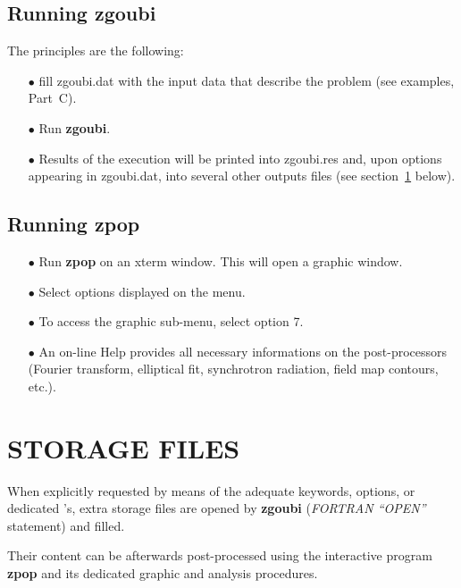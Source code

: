  \subsection{Running zgoubi} 

The principles are the following:
\begin{itemize}
\item[$\bullet$] fill zgoubi.dat    with the input data that describe the 
problem (see examples, Part~C). 
\item[$\bullet$] Run  \textbf{zgoubi}. 
\item[$\bullet$] Results of the execution will be printed into  
zgoubi.res  and, upon options appearing in zgoubi.dat,
 into several other outputs files (see section~\ref{secD-3} below).  
\end{itemize}

\subsection{Running zpop} 

\begin{itemize}
\item[$\bullet$] Run \textbf{zpop} on an xterm window. This will open a 
graphic window. 
\item[$\bullet$] Select options displayed on the menu.   
\item[$\bullet$] To access the graphic sub-menu, select option 7. 
\item[$\bullet$] An on-line Help provides all necessary informations 
on the post-processors (Fourier transform, elliptical fit, synchrotron 
radiation, field map contours, etc.).
\end{itemize}

\section{STORAGE FILES} \label{secD-3}

When explicitly requested by means of the adequate keywords,  options, or dedicated 
\LABEL's, extra storage files are opened by \textbf{zgoubi} 
(\textsl{FORTRAN ``OPEN''} statement) and filled. 

Their content can be  afterwards  post-processed using the interactive program \textbf{zpop} and its dedicated graphic 
and analysis procedures. 

\bigskip

